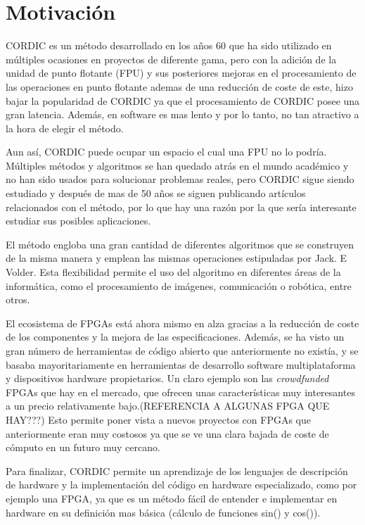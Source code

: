 \chapter{Motivación}
\label{motivacion}

CORDIC es un método desarrollado en los años 60 que ha sido utilizado en múltiples ocasiones en proyectos de diferente gama, pero con la adición de la unidad de punto flotante (FPU) y sus posteriores mejoras en el procesamiento de las operaciones en punto flotante ademas de una reducción de coste de este, hizo bajar la popularidad de CORDIC ya que el procesamiento de CORDIC posee una gran latencia. Además, en software es mas lento y por lo tanto, no tan atractivo a la hora de elegir el método.

Aun así, CORDIC puede ocupar un espacio el cual una FPU no lo podría. Múltiples métodos y algoritmos se han quedado atrás en el mundo académico y no han sido usados para solucionar problemas reales, pero CORDIC sigue siendo estudiado y después de mas de 50 años se siguen publicando artículos relacionados con el método, por lo que hay una razón por la que sería interesante estudiar sus posibles aplicaciones.

El método engloba una gran cantidad de diferentes algoritmos que se construyen de la misma manera y emplean las mismas operaciones estipuladas por Jack. E Volder. Esta flexibilidad permite el uso del algoritmo en diferentes áreas de la informática, como el procesamiento de imágenes, comunicación o robótica, entre otros.

El ecosistema de FPGAs está ahora mismo en alza gracias a la reducción de coste de los componentes y la mejora de las especificaciones. Además, se ha visto un gran número de herramientas de código abierto que anteriormente no existía, y se basaba mayoritariamente en herramientas de desarrollo software multiplataforma y dispositivos hardware propietarios. Un claro ejemplo son las \textit{crowdfunded} FPGAs que hay en el mercado, que ofrecen unas características muy interesantes a un precio relativamente bajo.(REFERENCIA A ALGUNAS FPGA QUE HAY???) Esto permite poner vista a nuevos proyectos con FPGAs que anteriormente eran muy costosos ya que se ve una clara bajada de coste de cómputo en un futuro muy cercano.

Para finalizar, CORDIC permite un aprendizaje de los lenguajes de descripción de hardware y la implementación del código en hardware especializado, como por ejemplo una FPGA, ya que es un método fácil de entender e implementar en hardware en su definición mas básica (cálculo de funciones sin() y cos()).
